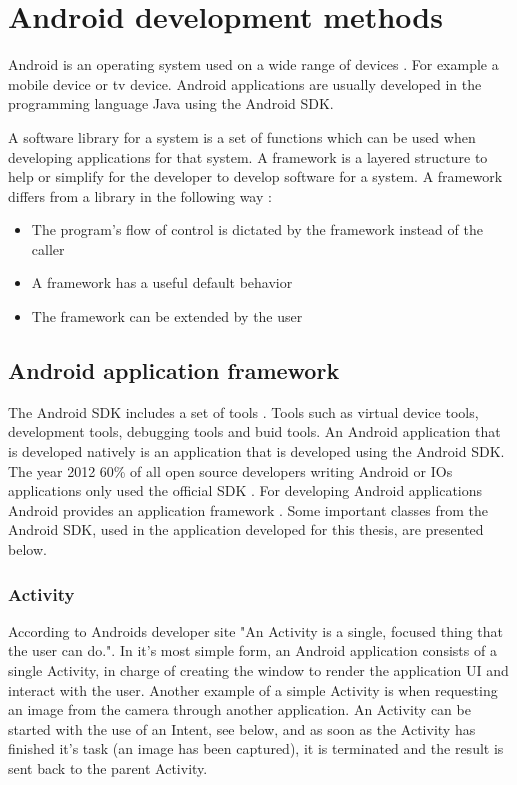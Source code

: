 \section{Android development methods}\label{section-android-development-methods}
Android is an operating system used on a wide range of devices \cite{dell2011}. For example a mobile device or tv device. Android applications are usually developed in the programming language Java using the Android SDK.

A software library for a system is a set of functions which can be used when developing applications for that system. A framework is a layered structure to help or simplify for the developer to develop software for a system. A framework differs from a library in the following way \cite{riehle2000}:

\begin{itemize}
\item The program's flow of control is dictated by the framework instead of the caller
\item A framework has a useful default behavior
\item The framework can be extended by the user
\end{itemize}

\subsection{Android application framework} 
The Android SDK includes a set of tools \cite{sdk2015}. Tools such as virtual device tools, development tools, debugging tools and buid tools. An Android application that is developed natively is an application that is developed using the Android SDK. The year 2012 60\% of all open source developers writing Android or IOs applications only used the official SDK \cite{eclipse2012}. For developing Android applications Android provides an application framework \cite{android-framework2015}. Some important classes from the Android SDK, used in the application developed for this thesis, are presented below.

\subsubsection{Activity}\label{sec:activity}
According to Androids developer site \cite{activity2015} "An Activity is a single, focused thing that the user can do.". In it's most simple form, an Android application consists of a single Activity, in charge of creating the window to render the application UI and interact with the user. Another example of a simple Activity is when requesting an image from the camera through another application. An Activity can be started with the use of an Intent, see below, and as soon as the Activity has finished it's task (an image has been captured), it is terminated and the result is sent back to the parent Activity.

